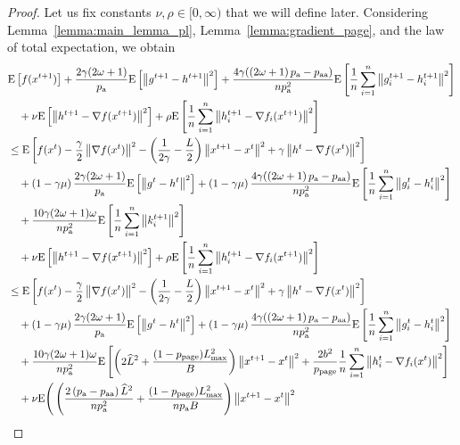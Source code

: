\documentclass{article}
\newcommand*{\probavailable}{\ensuremath{p_{\textnormal{a}}}}
\newcommand*{\probpairaa}{\ensuremath{p_{\textnormal{aa}}}}
\newcommand*{\probpage}{\ensuremath{p_{\text{page}}}}
\begin{document}
\begin{proof}
  Let us fix constants $\nu, \rho \in [0,\infty)$ that we will define later. Considering Lemma~\ref{lemma:main_lemma_pl}, Lemma~\ref{lemma:gradient_page}, and the law of total expectation, we obtain
    \begin{align*}
      &\Exp{f(x^{t + 1})} + \frac{2\gamma (2\omega + 1)}{\probavailable} \Exp{\norm{g^{t+1} - h^{t+1}}^2} + \frac{4 \gamma (\left(2 \omega + 1\right)\probavailable - \probpairaa)}{n \probavailable^2} \Exp{\frac{1}{n}\sum_{i=1}^n\norm{g^{t+1}_i - h^{t+1}_i}^2}\\
      &\quad  + \nu \Exp{\norm{h^{t+1} - \nabla f(x^{t+1})}^2} + \rho \Exp{\frac{1}{n}\sum_{i=1}^n\norm{h^{t+1}_i - \nabla f_i(x^{t+1})}^2}\\
      &\leq \Exp{f(x^t) - \frac{\gamma}{2}\norm{\nabla f(x^t)}^2 - \left(\frac{1}{2\gamma} - \frac{L}{2}\right)
      \norm{x^{t+1} - x^t}^2 + \gamma \norm{h^{t} - \nabla f(x^t)}^2}\nonumber\\
      &\quad + \left(1 - \gamma \mu\right)\frac{2\gamma(2\omega + 1)}{\probavailable}\Exp{\norm{g^{t} - h^t}^2} + \left(1 - \gamma \mu\right)\frac{4 \gamma (\left(2 \omega + 1\right)\probavailable - \probpairaa)}{n \probavailable^2}\Exp{\frac{1}{n} \sum_{i=1}^n\norm{g^t_i - h^{t}_i}^2}\nonumber\\
      &\quad + \frac{10 \gamma (2 \omega + 1)\omega}{n \probavailable^2}\Exp{\frac{1}{n} \sum_{i=1}^n\norm{k^{t+1}_i}^2} \\
      &\quad  + \nu \Exp{\norm{h^{t+1} - \nabla f(x^{t+1})}^2} + \rho \Exp{\frac{1}{n}\sum_{i=1}^n\norm{h^{t+1}_i - \nabla f_i(x^{t+1})}^2}\\
      &\leq \Exp{f(x^t) - \frac{\gamma}{2}\norm{\nabla f(x^t)}^2 - \left(\frac{1}{2\gamma} - \frac{L}{2}\right)
      \norm{x^{t+1} - x^t}^2 + \gamma \norm{h^{t} - \nabla f(x^t)}^2}\nonumber\\
      &\quad + \left(1 - \gamma \mu\right)\frac{2\gamma(2\omega + 1)}{\probavailable}\Exp{\norm{g^{t} - h^t}^2} + \left(1 - \gamma \mu\right)\frac{4 \gamma (\left(2 \omega + 1\right)\probavailable - \probpairaa)}{n \probavailable^2}\Exp{\frac{1}{n} \sum_{i=1}^n\norm{g^t_i - h^{t}_i}^2}\nonumber\\
      &\quad + \frac{10 \gamma (2 \omega + 1)\omega}{n \probavailable^2}\Exp{\left(2 \widehat{L}^2 + \frac{(1 - \probpage)L_{\max}^2}{B}\right)\norm{x^{t+1} - x^{t}}^2 +  \frac{2b^2}{\probpage} \frac{1}{n}\sum_{i=1}^n \norm{h^t_i - \nabla f_i(x^{t})}^2} \\
      &\quad  + \nu {\rm E}\Bigg(\left(\frac{2 \left(\probavailable - \probpairaa\right) \widehat{L}^2}{n \probavailable^2} + \frac{(1 - \probpage)L_{\max}^2}{n \probavailable B}\right) \norm{x^{t+1} - x^{t}}^2\\

\end{align*}
\end{proof}
\end{document}

